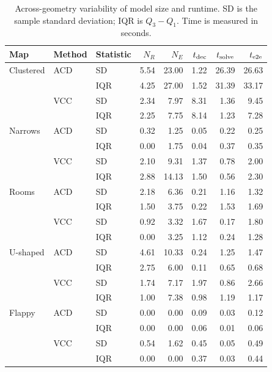 \begin{table}[htbp]
\caption{Across-geometry variability of model size and runtime. SD is the sample standard deviation; IQR is $Q_3-Q_1$. Time is measured in seconds.}
\label{tab:exp-runtime-var}
\centering
\scriptsize
\setlength{\tabcolsep}{3.0pt}
\begin{tabular}{@{}lllrrrrr@{}}
\toprule
Map & Method & Statistic & $N_R$ & $N_E$ & $t_{\rm dec}$ & $t_{\rm solve}$ & $t_{\rm e2e}$ \\
\midrule
Clustered & ACD & SD  & 5.54 & 23.00 & 1.22 & 26.39 & 26.63 \\
          &     & IQR & 4.25 & 27.00 & 1.52 & 31.39 & 33.17 \\
          & VCC & SD  & 2.34 & 7.97  & 8.31 & 1.36  & 9.45 \\
          &     & IQR & 2.25 & 7.75  & 8.14 & 1.23  & 7.28 \\
Narrows   & ACD & SD  & 0.32 & 1.25  & 0.05 & 0.22  & 0.25 \\
          &     & IQR & 0.00 & 1.75  & 0.04 & 0.37  & 0.35 \\
          & VCC & SD  & 2.10 & 9.31  & 1.37 & 0.78  & 2.00 \\
          &     & IQR & 2.88 & 14.13 & 1.50 & 0.56  & 2.30 \\
Rooms     & ACD & SD  & 2.18 & 6.36  & 0.21 & 1.16  & 1.32 \\
          &     & IQR & 1.50 & 3.75  & 0.22 & 1.53  & 1.69 \\
          & VCC & SD  & 0.92 & 3.32  & 1.67 & 0.17  & 1.80 \\
          &     & IQR & 0.00 & 3.25  & 1.12 & 0.24  & 1.28 \\
U-shaped  & ACD & SD  & 4.61 & 10.33 & 0.24 & 1.25  & 1.47 \\
          &     & IQR & 2.75 & 6.00  & 0.11 & 0.65  & 0.68 \\
          & VCC & SD  & 1.74 & 7.17  & 1.97 & 0.86  & 2.66 \\
          &     & IQR & 1.00 & 7.38  & 0.98 & 1.19  & 1.17 \\
Flappy    & ACD & SD  & 0.00 & 0.00  & 0.09 & 0.03  & 0.12 \\
          &     & IQR & 0.00 & 0.00  & 0.06 & 0.01  & 0.06 \\
          & VCC & SD  & 0.54 & 1.62  & 0.45 & 0.05  & 0.49 \\
          &     & IQR & 0.00 & 0.00  & 0.37 & 0.03  & 0.44 \\
\bottomrule
\end{tabular}
\end{table}

